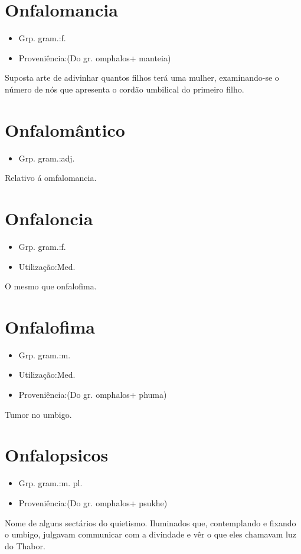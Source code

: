 \section{Onfalomancia}
\begin{itemize}
\item {Grp. gram.:f.}
\end{itemize}
\begin{itemize}
\item {Proveniência:(Do gr. \textunderscore omphalos\textunderscore  + \textunderscore manteia\textunderscore )}
\end{itemize}
Suposta arte de adivinhar quantos filhos terá uma mulher, examinando-se o número de nós que apresenta o cordão umbilical do primeiro filho.
\section{Onfalomântico}
\begin{itemize}
\item {Grp. gram.:adj.}
\end{itemize}
Relativo á omfalomancia.
\section{Onfaloncia}
\begin{itemize}
\item {Grp. gram.:f.}
\end{itemize}
\begin{itemize}
\item {Utilização:Med.}
\end{itemize}
O mesmo que \textunderscore onfalofima\textunderscore .
\section{Onfalofima}
\begin{itemize}
\item {Grp. gram.:m.}
\end{itemize}
\begin{itemize}
\item {Utilização:Med.}
\end{itemize}
\begin{itemize}
\item {Proveniência:(Do gr. \textunderscore omphalos\textunderscore  + \textunderscore phuma\textunderscore )}
\end{itemize}
Tumor no umbigo.
\section{Onfalopsicos}
\begin{itemize}
\item {Grp. gram.:m. pl.}
\end{itemize}
\begin{itemize}
\item {Proveniência:(Do gr. \textunderscore omphalos\textunderscore  + \textunderscore psukhe\textunderscore )}
\end{itemize}
Nome de alguns sectários do quietismo.
Iluminados que, contemplando e fixando o umbigo, julgavam communicar com a divindade e vêr o que eles chamavam luz do Thabor.
